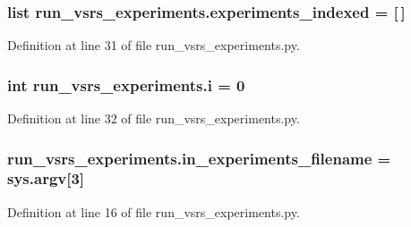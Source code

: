 \subsubsection[{\texorpdfstring{experiments\+\_\+indexed}{experiments_indexed}}]{\setlength{\rightskip}{0pt plus 5cm}list run\+\_\+vsrs\+\_\+experiments.\+experiments\+\_\+indexed = \mbox{[}$\,$\mbox{]}}\hypertarget{namespacerun__vsrs__experiments_abec2d7761f5ef2f337a46cbc4a8977b7}{}\label{namespacerun__vsrs__experiments_abec2d7761f5ef2f337a46cbc4a8977b7}


Definition at line 31 of file run\+\_\+vsrs\+\_\+experiments.\+py.

\subsubsection[{\texorpdfstring{i}{i}}]{\setlength{\rightskip}{0pt plus 5cm}int run\+\_\+vsrs\+\_\+experiments.\+i = 0}\hypertarget{namespacerun__vsrs__experiments_a45f41fbaac363730cac7f912b2382e2b}{}\label{namespacerun__vsrs__experiments_a45f41fbaac363730cac7f912b2382e2b}


Definition at line 32 of file run\+\_\+vsrs\+\_\+experiments.\+py.

\subsubsection[{\texorpdfstring{in\+\_\+experiments\+\_\+filename}{in_experiments_filename}}]{\setlength{\rightskip}{0pt plus 5cm}run\+\_\+vsrs\+\_\+experiments.\+in\+\_\+experiments\+\_\+filename = sys.\+argv\mbox{[}3\mbox{]}}\hypertarget{namespacerun__vsrs__experiments_ad6902d87996045a9e7e607a7045f3901}{}\label{namespacerun__vsrs__experiments_ad6902d87996045a9e7e607a7045f3901}


Definition at line 16 of file run\+\_\+vsrs\+\_\+experiments.\+py.

